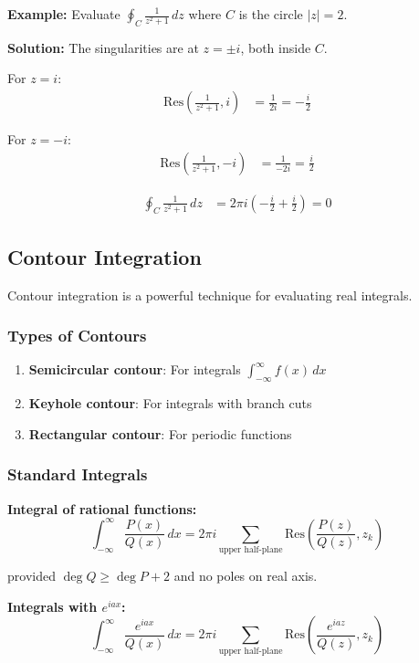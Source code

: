 \documentclass[12pt,a4paper]{article}
\begin{document}
\begin{examplebox}
\textbf{Example:} Evaluate $\oint_C \frac{1}{z^2 + 1} \, dz$ where $C$ is the circle $|z| = 2$.

\textbf{Solution:} The singularities are at $z = \pm i$, both inside $C$.

For $z = i$:
\begin{align}
\text{Res}\left(\frac{1}{z^2 + 1}, i\right) &= \frac{1}{2i} = -\frac{i}{2}
\end{align}

For $z = -i$:
\begin{align}
\text{Res}\left(\frac{1}{z^2 + 1}, -i\right) &= \frac{1}{-2i} = \frac{i}{2}
\end{align}

\begin{align}
\oint_C \frac{1}{z^2 + 1} \, dz &= 2\pi i\left(-\frac{i}{2} + \frac{i}{2}\right) = 0
\end{align}
\end{examplebox}

\subsection{Contour Integration}
Contour integration is a powerful technique for evaluating real integrals.

\subsubsection{Types of Contours}
\begin{enumerate}
    \item \textbf{Semicircular contour}: For integrals $\int_{-\infty}^{\infty} f(x) \, dx$
    \item \textbf{Keyhole contour}: For integrals with branch cuts
    \item \textbf{Rectangular contour}: For periodic functions
\end{enumerate}

\subsubsection{Standard Integrals}
\begin{formulabox}
\textbf{Integral of rational functions:}
\begin{equation}
\int_{-\infty}^{\infty} \frac{P(x)}{Q(x)} \, dx = 2\pi i \sum_{\text{upper half-plane}} \text{Res}\left(\frac{P(z)}{Q(z)}, z_k\right)
\end{equation}

provided $\deg Q \geq \deg P + 2$ and no poles on real axis.

\textbf{Integrals with $e^{iax}$:}
\begin{equation}
\int_{-\infty}^{\infty} \frac{e^{iax}}{Q(x)} \, dx = 2\pi i \sum_{\text{upper half-plane}} \text{Res}\left(\frac{e^{iaz}}{Q(z)}, z_k\right)
\end{equation}
\end{formulabox}
\end{document}
